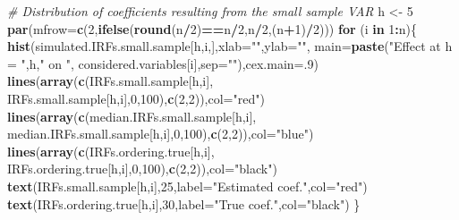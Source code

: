 \documentclass[
  11pt,
]{book}
\newenvironment{Shaded}{\begin{snugshade}}{\end{snugshade}}
\newcommand{\AttributeTok}[1]{\textcolor[rgb]{0.13,0.29,0.53}{#1}}
\newcommand{\CommentTok}[1]{\textcolor[rgb]{0.56,0.35,0.01}{\textit{#1}}}
\newcommand{\ControlFlowTok}[1]{\textcolor[rgb]{0.13,0.29,0.53}{\textbf{#1}}}
\newcommand{\DecValTok}[1]{\textcolor[rgb]{0.00,0.00,0.81}{#1}}
\newcommand{\FunctionTok}[1]{\textcolor[rgb]{0.13,0.29,0.53}{\textbf{#1}}}
\newcommand{\NormalTok}[1]{#1}
\newcommand{\OtherTok}[1]{\textcolor[rgb]{0.56,0.35,0.01}{#1}}
\newcommand{\SpecialCharTok}[1]{\textcolor[rgb]{0.81,0.36,0.00}{\textbf{#1}}}
\newcommand{\StringTok}[1]{\textcolor[rgb]{0.31,0.60,0.02}{#1}}
\theoremstyle{definition}
\theoremstyle{definition}
\theoremstyle{definition}
\theoremstyle{definition}
\theoremstyle{remark}
\begin{document}
\begin{Shaded}
\begin{Highlighting}[]
\CommentTok{\# Distribution of coefficients resulting from the small sample VAR}
\NormalTok{h }\OtherTok{\textless{}{-}} \DecValTok{5}
\FunctionTok{par}\NormalTok{(}\AttributeTok{mfrow=}\FunctionTok{c}\NormalTok{(}\DecValTok{2}\NormalTok{,}\FunctionTok{ifelse}\NormalTok{(}\FunctionTok{round}\NormalTok{(n}\SpecialCharTok{/}\DecValTok{2}\NormalTok{)}\SpecialCharTok{==}\NormalTok{n}\SpecialCharTok{/}\DecValTok{2}\NormalTok{,n}\SpecialCharTok{/}\DecValTok{2}\NormalTok{,(n}\SpecialCharTok{+}\DecValTok{1}\NormalTok{)}\SpecialCharTok{/}\DecValTok{2}\NormalTok{)))}
\ControlFlowTok{for}\NormalTok{ (i }\ControlFlowTok{in} \DecValTok{1}\SpecialCharTok{:}\NormalTok{n)\{}
  \FunctionTok{hist}\NormalTok{(simulated.IRFs.small.sample[h,i,],}\AttributeTok{xlab=}\StringTok{""}\NormalTok{,}\AttributeTok{ylab=}\StringTok{""}\NormalTok{,}
       \AttributeTok{main=}\FunctionTok{paste}\NormalTok{(}\StringTok{"Effect at h = "}\NormalTok{,h,}\StringTok{" on "}\NormalTok{,}
\NormalTok{                  considered.variables[i],}\AttributeTok{sep=}\StringTok{""}\NormalTok{),}\AttributeTok{cex.main=}\NormalTok{.}\DecValTok{9}\NormalTok{)}
  \FunctionTok{lines}\NormalTok{(}\FunctionTok{array}\NormalTok{(}\FunctionTok{c}\NormalTok{(IRFs.small.sample[h,i],}
\NormalTok{                IRFs.small.sample[h,i],}\DecValTok{0}\NormalTok{,}\DecValTok{100}\NormalTok{),}\FunctionTok{c}\NormalTok{(}\DecValTok{2}\NormalTok{,}\DecValTok{2}\NormalTok{)),}\AttributeTok{col=}\StringTok{"red"}\NormalTok{)}
  \FunctionTok{lines}\NormalTok{(}\FunctionTok{array}\NormalTok{(}\FunctionTok{c}\NormalTok{(median.IRFs.small.sample[h,i],}
\NormalTok{                median.IRFs.small.sample[h,i],}\DecValTok{0}\NormalTok{,}\DecValTok{100}\NormalTok{),}\FunctionTok{c}\NormalTok{(}\DecValTok{2}\NormalTok{,}\DecValTok{2}\NormalTok{)),}\AttributeTok{col=}\StringTok{"blue"}\NormalTok{)}
  \FunctionTok{lines}\NormalTok{(}\FunctionTok{array}\NormalTok{(}\FunctionTok{c}\NormalTok{(IRFs.ordering.true[h,i],}
\NormalTok{                IRFs.ordering.true[h,i],}\DecValTok{0}\NormalTok{,}\DecValTok{100}\NormalTok{),}\FunctionTok{c}\NormalTok{(}\DecValTok{2}\NormalTok{,}\DecValTok{2}\NormalTok{)),}\AttributeTok{col=}\StringTok{"black"}\NormalTok{)}
  \FunctionTok{text}\NormalTok{(IRFs.small.sample[h,i],}\DecValTok{25}\NormalTok{,}\AttributeTok{label=}\StringTok{"Estimated coef."}\NormalTok{,}\AttributeTok{col=}\StringTok{"red"}\NormalTok{)}
  \FunctionTok{text}\NormalTok{(IRFs.ordering.true[h,i],}\DecValTok{30}\NormalTok{,}\AttributeTok{label=}\StringTok{"True coef."}\NormalTok{,}\AttributeTok{col=}\StringTok{"black"}\NormalTok{)}
\NormalTok{\}}
\end{Highlighting}
\end{Shaded}
\end{document}
